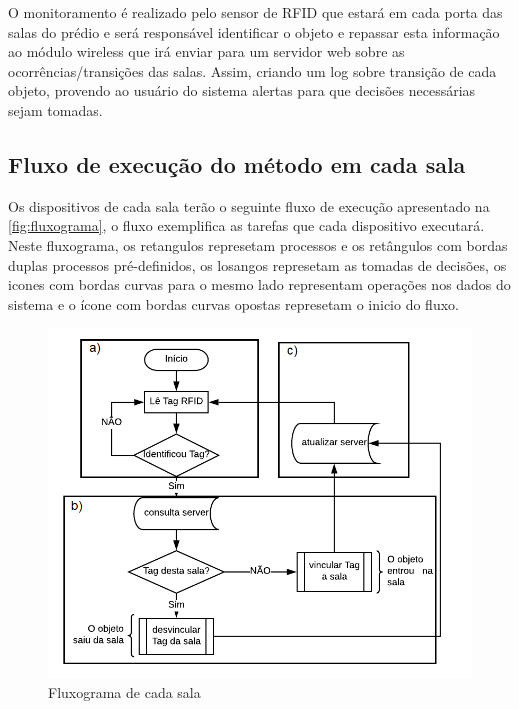 O monitoramento é realizado pelo sensor de RFID que estará em cada porta das salas do prédio e será responsável 
identificar o objeto e repassar esta informação ao módulo wireless que irá enviar para um servidor web sobre as 
ocorrências/transições das salas. Assim, criando um log sobre transição de cada objeto, provendo ao usuário do sistema 
alertas para que decisões necessárias sejam tomadas.



\subsection{Fluxo de execução do método em cada sala}
Os dispositivos de cada sala terão o seguinte fluxo de execução apresentado na \autoref{fig:fluxograma}, 
o fluxo exemplifica as tarefas que cada dispositivo executará. Neste fluxograma, os retangulos represetam 
processos e os retângulos com bordas duplas processos pré-definidos, os losangos represetam as tomadas de decisões, 
os icones com bordas curvas para o mesmo lado representam operações nos dados do sistema e o ícone com bordas curvas 
opostas represetam o inicio do fluxo.

\begin{figure}[H]
              \caption{\label{fig:fluxograma}{Fluxograma de cada sala}}
              \centering
              \includegraphics[width=1\textwidth]{Figuras/fluxograma.png}
\end{figure}

